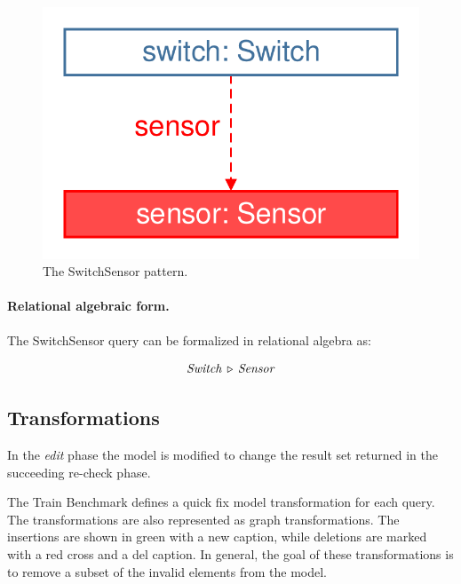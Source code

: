 \begin{figure}[Htb]
	\centering
	\includegraphics[scale=0.4]{figures/trainbenchmark-switchsensor}
	\caption{The \textsf{SwitchSensor} pattern.}
	\label{fig:trainbenchmark-switchsensor}
\end{figure}

\paragraph{Relational algebraic form.} The \textsf{SwitchSensor} query can be formalized in relational algebra as:

$$ \mathit{Switch} \, \triangleright \, \mathit{Sensor} $$


\subsection{Transformations}
\label{sec:transformatios}

In the \emph{edit} phase the model is modified to change the result set returned in the succeeding re-check phase.

The Train Benchmark defines a quick fix model transformation for each query. The transformations are also represented as graph transformations. The insertions are shown in green with a \guillemotleft{}new\guillemotright{} caption, while deletions are marked with a red cross and a \guillemotleft{}del\guillemotright{} caption. In general, the goal of these transformations is to remove a subset of the invalid elements from the model.

